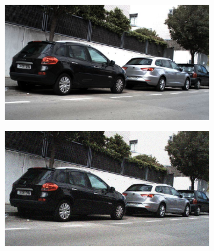 \documentclass[a4paper]{ctexart}
\begin{document}
\begin{figure}[htbp]
\begin{subfigure}{0.08\textwidth}
				\label{fig：Gamma=0.4, Gauss Noise = 1.0}
			\end{subfigure} \\
			
			\vspace{-15pt}
			
			\begin{subfigure}{0.02\textwidth}
				\captionsetup{font=scriptsize}
				\caption*{}
				\vspace{-2pt}
			\end{subfigure}
			\begin{subfigure}{0.08\textwidth}
				\captionsetup{font=scriptsize}
				\includegraphics[width=\linewidth]{picture/Edge Detection/degrade/RGB_001 Gamma=0.5, Gauss Noise=0.0}
				\label{fig: Gamma=0.5, Gauss Noise = 0.0}
			\end{subfigure}
			\begin{subfigure}{0.08\textwidth}
				\captionsetup{font=scriptsize}
				\includegraphics[width=\linewidth]{picture/Edge Detection/degrade/RGB_001 Gamma=0.5, Gauss Noise=0.1}

\end{subfigure}
\end{figure}
\end{document}
